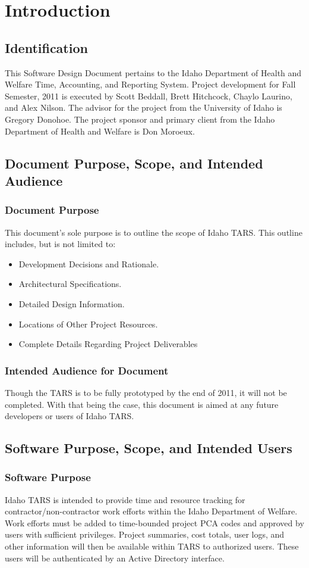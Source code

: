 \documentclass[letterpaper]{article}
\begin{document}
\pagebreak
\section{\bfseries{Introduction}}
\subsection{\bfseries{Identification}}
This Software Design Document pertains to the Idaho Department of Health and Welfare Time, Accounting, and Reporting System. Project development for Fall Semester, 2011 is executed by Scott Beddall, Brett Hitchcock, Chaylo Laurino, and Alex Nilson. The advisor for the project from the University of Idaho is Gregory Donohoe. The project sponsor and primary client from the Idaho Department of Health and Welfare is Don Moroeux. 
\subsection{\bfseries{Document Purpose, Scope, and Intended Audience}}
\subsubsection{Document Purpose}
This document's sole purpose is to outline the scope of Idaho TARS. This outline includes, but is not limited to:
\begin{itemize}
\item Development Decisions and Rationale.
\item Architectural Specifications.
\item Detailed Design Information.
\item Locations of Other Project Resources.
\item Complete Details Regarding Project Deliverables
\end{itemize}
\subsubsection{Intended Audience for Document}
Though the TARS is to be fully prototyped by the end of 2011, it will not be completed. With that being the case, this document is aimed at any future developers or users of Idaho TARS. 

\subsection{\bfseries{Software Purpose, Scope, and Intended Users}}
\subsubsection{Software Purpose}
Idaho TARS is intended to provide time and resource tracking for contractor/non-contractor work efforts within the Idaho Department of Welfare. Work efforts must be added to time-bounded project PCA codes and approved by users with sufficient privileges. Project summaries, cost totals, user logs, and other information will then be available within TARS to authorized users. These users will be authenticated by an Active Directory interface.     
\end{document}
